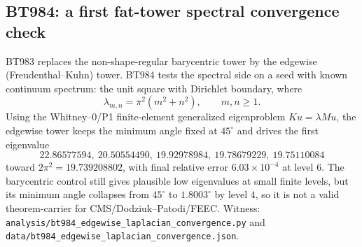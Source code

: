 \subsection*{BT984: a first fat-tower spectral convergence check}

BT983 replaces the non-shape-regular barycentric tower by the edgewise
(Freudenthal--Kuhn) tower.  BT984 tests the spectral side on a seed with known
continuum spectrum: the unit square with Dirichlet boundary, where
\[
  \lambda_{m,n}=\pi^2(m^2+n^2),\qquad m,n\ge 1.
\]
Using the Whitney--0/P1 finite-element generalized eigenproblem
\(Ku=\lambda Mu\), the edgewise tower keeps the minimum angle fixed at
\(45^\circ\) and drives the first eigenvalue
\[
  22.86577594,\ 20.50554490,\ 19.92978984,\ 19.78679229,\ 19.75110084
\]
toward \(2\pi^2=19.739208802\), with final relative error
\(6.03\times10^{-4}\) at level \(6\).  The barycentric control still gives
plausible low eigenvalues at small finite levels, but its minimum angle
collapses from \(45^\circ\) to \(1.8003^\circ\) by level \(4\), so it is not a
valid theorem-carrier for CMS/Dodziuk--Patodi/FEEC.  Witness:
\texttt{analysis/bt984\_edgewise\_laplacian\_convergence.py} and
\texttt{data/bt984\_edgewise\_laplacian\_convergence.json}.
